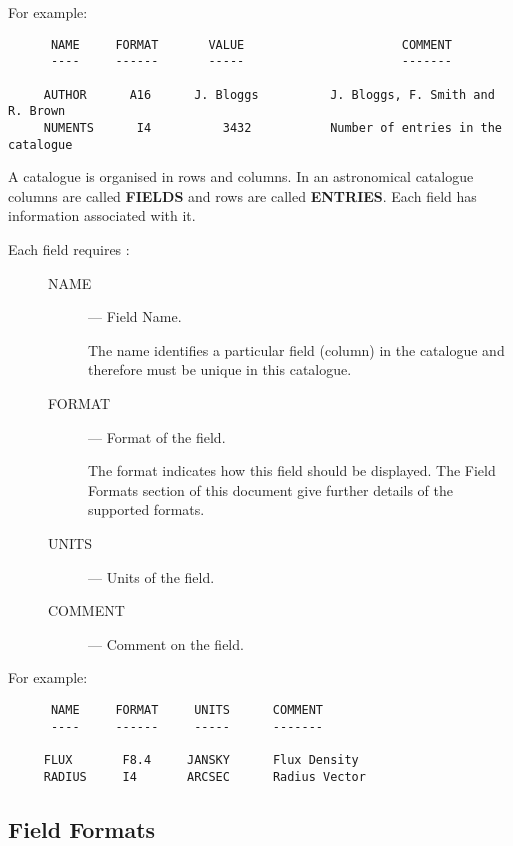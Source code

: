 For example:
\begin{small}
\begin{verbatim}
      NAME     FORMAT       VALUE                      COMMENT
      ----     ------       -----                      -------

     AUTHOR      A16      J. Bloggs          J. Bloggs, F. Smith and R. Brown
     NUMENTS      I4          3432           Number of entries in the catalogue
\end{verbatim}
\end{small}

A catalogue is organised in rows and columns. In an astronomical  catalogue 
columns are called 
{\bf FIELDS} and rows are called {\bf ENTRIES}. Each field has information 
associated with it.

Each field requires :
 
\begin{description}
\item[\mbox{}]\mbox{}
\begin{description}
\item [NAME] --- Field Name. 

The name identifies a particular field (column) in the 
catalogue and therefore must be unique in this catalogue.

\item [FORMAT] --- Format of the field.

The format indicates how this field should be displayed. The Field Formats
section of this document give further details of the supported formats.

\item [UNITS] --- Units of the field.

\item [COMMENT] --- Comment on the field.

\end{description}
\end{description}

For example:

\begin{small}
\begin{verbatim}
      NAME     FORMAT     UNITS      COMMENT
      ----     ------     -----      -------

     FLUX       F8.4     JANSKY      Flux Density   
     RADIUS     I4       ARCSEC      Radius Vector
\end{verbatim}
\end{small}

\subsection {Field Formats}
 
